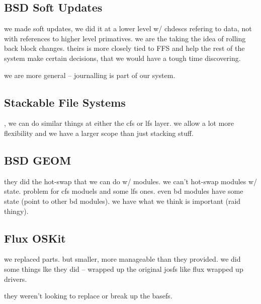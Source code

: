 \subsection{BSD Soft Updates}

\cite{ganger00soft}
we made soft updates, we did it at a lower level w/ chdescs refering to
data, not with references to higher level primatives. we are the
taking the idea of rolling back block changes. theirs is more closely
tied to FFS and help the rest of the system make certain decisions,
that we would have a tough time discovering.

we are more general -- journalling is part of our system.

\subsection{Stackable File Systems}

\cite{zadok00fist}, \cite{heidemann93stack}
we can do similar things at either the cfs or lfs layer. we allow a
lot more flexibility and we have a larger scope than just stacking
stuff.

\subsection{BSD GEOM}

they did the hot-swap that we can do w/ modules. we can't hot-swap
modules w/ state. problem for cfs moduels and some lfs ones. even bd
modules have some state (point to other bd modules). we have what we
think is important (raid thingy).

\subsection{Flux OSKit}

\cite{ford97oskit}
we replaced parts. but smaller, more manageable than they provided. we
did some things lke they did -- wrapped up the original josfs like
flux wrapped up drivers.

they weren't looking to replace or break up the basefs.

